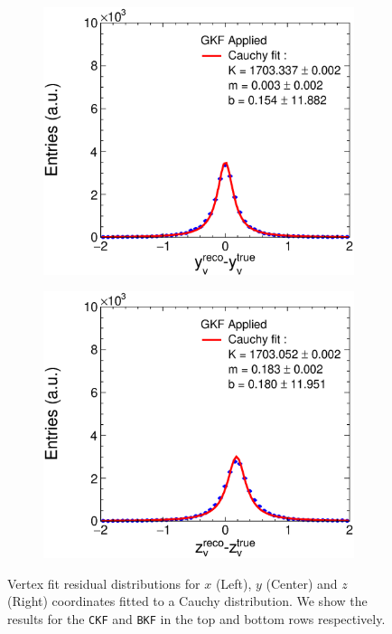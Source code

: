 \begin{figure}[t]
\begin{subfigure}{0.32\textwidth}
         \caption{}
         \label{fig:VertXGKF_Integration}
     \end{subfigure}
     \begin{subfigure}{0.32\textwidth}
         \centering
         \includegraphics[width=\textwidth]{figures/ch5-KF_NDGAr/FullSample/Integration/ResYGKF.eps}
         \caption{}
         \label{fig:VertYGKF_Integration}
     \end{subfigure}
    \begin{subfigure}{0.32\textwidth}
         \centering
         \includegraphics[width=\textwidth]{figures/ch5-KF_NDGAr/FullSample/Integration/ResZGKF.eps}
         \caption{}
         \label{fig:VertZGKF_Integration}
     \end{subfigure}
        \caption[Vertex fit residual distributions.]{Vertex fit residual distributions for $x$ (Left), $y$ (Center) and $z$ (Right) coordinates fitted to a Cauchy distribution. We show the results for the \texttt{CKF} and \texttt{BKF} in the top and bottom rows respectively.}
        \label{fig:Vert_Integration}
\end{figure}
